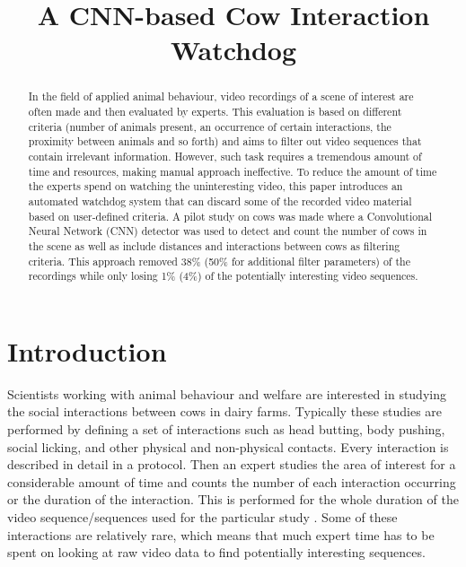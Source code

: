 \documentclass{cta-author}
\begin{document}
\title{A CNN-based Cow Interaction Watchdog}

\author{   }
\address{
}


\begin{abstract}
In the field of applied animal behaviour, video recordings of a scene of interest are often made and then evaluated by experts. This evaluation is based on different criteria (number of animals present, an occurrence of certain interactions, the proximity between animals and so forth) and aims to filter out video sequences that contain irrelevant information.  However,  such task requires a tremendous amount of time and resources, making manual approach ineffective. To reduce the amount of time the experts spend on watching the uninteresting video, this paper introduces an automated watchdog system that can discard some of the recorded video material based on user-defined criteria. A pilot study on cows was made where a Convolutional Neural Network (CNN) detector was used to detect and count the number of cows in the scene as well as include distances and interactions between cows as filtering criteria. This approach removed 38\% (50\% for additional filter parameters) of the recordings while only losing 1\% (4\%) of the potentially interesting video sequences. 
\end{abstract}

\maketitle

\section{Introduction}

Scientists working with animal behaviour and welfare are interested in studying the social interactions between cows in dairy farms. Typically these studies are performed by defining a set of interactions such as head butting, body pushing, social licking, and other physical and non-physical contacts. Every interaction is described in detail in a protocol. Then an expert studies the area of interest for a considerable amount of time and counts the number of each interaction occurring or the duration of the interaction. This is performed for the whole duration of the video sequence/sequences used for the particular study \cite{MartinandBateson2007}. Some of these interactions are relatively rare, which means that much expert time has to be spent on looking at raw video data to find potentially interesting sequences.
\end{document}
